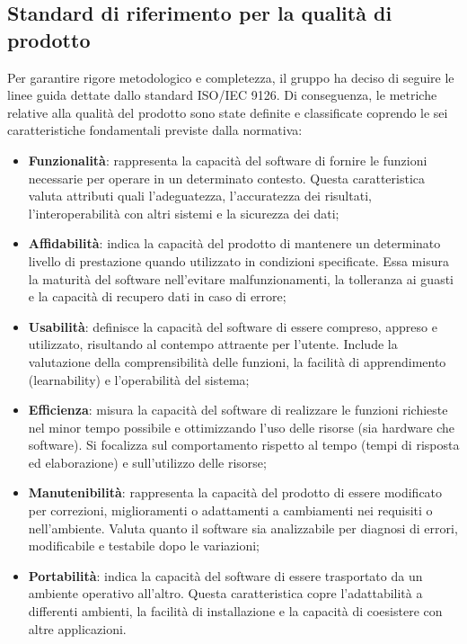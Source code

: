 \documentclass[a4paper,12pt]{article}
\begin{document}
    \subsection{Standard di riferimento per la qualità di prodotto}
        Per garantire rigore metodologico e completezza, il gruppo ha deciso di seguire le linee guida dettate dallo standard ISO/IEC 9126.
        Di conseguenza, le metriche relative alla qualità del prodotto sono state definite e classificate coprendo le sei caratteristiche fondamentali previste dalla normativa:
        \begin{itemize}
            \item \textbf{Funzionalità}: rappresenta la capacità del software di fornire le funzioni necessarie per operare in un determinato contesto. Questa caratteristica valuta attributi quali l'adeguatezza, l'accuratezza dei risultati, l'interoperabilità con altri sistemi e la sicurezza dei dati;
            \item \textbf{Affidabilità}: indica la capacità del prodotto di mantenere un determinato livello di prestazione quando utilizzato in condizioni specificate. Essa misura la maturità del software nell'evitare malfunzionamenti, la tolleranza ai guasti e la capacità di recupero dati in caso di errore;
            \item \textbf{Usabilità}: definisce la capacità del software di essere compreso, appreso e utilizzato, risultando al contempo attraente per l'utente. Include la valutazione della comprensibilità delle funzioni, la facilità di apprendimento (learnability) e l'operabilità del sistema;
            \item \textbf{Efficienza}: misura la capacità del software di realizzare le funzioni richieste nel minor tempo possibile e ottimizzando l'uso delle risorse (sia hardware che software). Si focalizza sul comportamento rispetto al tempo (tempi di risposta ed elaborazione) e sull'utilizzo delle risorse;
            \item \textbf{Manutenibilità}: rappresenta la capacità del prodotto di essere modificato per correzioni, miglioramenti o adattamenti a cambiamenti nei requisiti o nell'ambiente. Valuta quanto il software sia analizzabile per diagnosi di errori, modificabile e testabile dopo le variazioni;
            \item \textbf{Portabilità}: indica la capacità del software di essere trasportato da un ambiente operativo all'altro. Questa caratteristica copre l'adattabilità a differenti ambienti, la facilità di installazione e la capacità di coesistere con altre applicazioni.
        \end{itemize}
\end{document}
